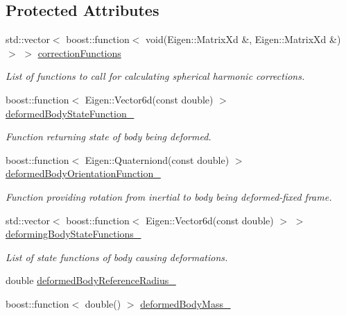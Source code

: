 \subsection*{Protected Attributes}
\begin{DoxyCompactItemize}
\item 
std\+::vector$<$ boost\+::function$<$ void(Eigen\+::\+Matrix\+Xd \&, Eigen\+::\+Matrix\+Xd \&) $>$ $>$ \hyperlink{classtudat_1_1gravitation_1_1BasicSolidBodyTideGravityFieldVariations_aa875438d3e5e31a16b45c0009975954a}{correction\+Functions}
\begin{DoxyCompactList}\small\item\em List of functions to call for calculating spherical harmonic corrections. \end{DoxyCompactList}\item 
boost\+::function$<$ Eigen\+::\+Vector6d(const double) $>$ \hyperlink{classtudat_1_1gravitation_1_1BasicSolidBodyTideGravityFieldVariations_a5d3b0e842e58504144a2e2e2ef96c90a}{deformed\+Body\+State\+Function\+\_\+}
\begin{DoxyCompactList}\small\item\em Function returning state of body being deformed. \end{DoxyCompactList}\item 
boost\+::function$<$ Eigen\+::\+Quaterniond(const double) $>$ \hyperlink{classtudat_1_1gravitation_1_1BasicSolidBodyTideGravityFieldVariations_a2ee3f417b4324455f45a353282759149}{deformed\+Body\+Orientation\+Function\+\_\+}
\begin{DoxyCompactList}\small\item\em Function providing rotation from inertial to body being deformed-\/fixed frame. \end{DoxyCompactList}\item 
std\+::vector$<$ boost\+::function$<$ Eigen\+::\+Vector6d(const double) $>$ $>$ \hyperlink{classtudat_1_1gravitation_1_1BasicSolidBodyTideGravityFieldVariations_aa007e8a4b2423b484bf49eb46dac39c9}{deforming\+Body\+State\+Functions\+\_\+}
\begin{DoxyCompactList}\small\item\em List of state functions of body causing deformations. \end{DoxyCompactList}\item 
double \hyperlink{classtudat_1_1gravitation_1_1BasicSolidBodyTideGravityFieldVariations_abe0acaf654a36869a9abd709a09607b0}{deformed\+Body\+Reference\+Radius\+\_\+}
\item 
boost\+::function$<$ double() $>$ \hyperlink{classtudat_1_1gravitation_1_1BasicSolidBodyTideGravityFieldVariations_ab12ae5c98ab6a31a2bbff565f1dc157c}{deformed\+Body\+Mass\+\_\+}

\end{DoxyCompactItemize}
